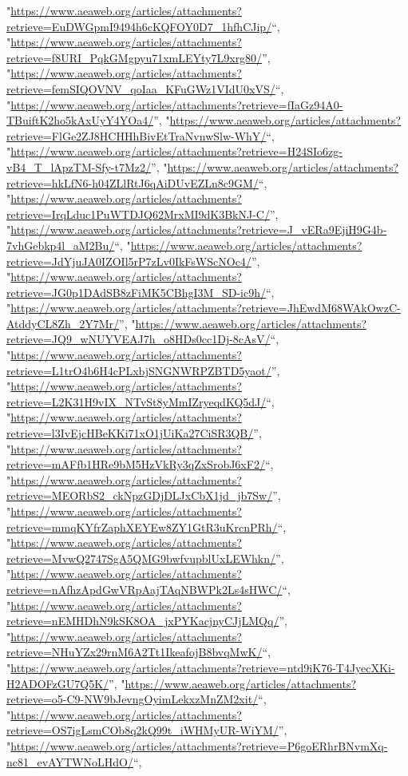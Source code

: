 \documentclass[]{article}
\begin{document}
\begin{itemize}
  "\url{https://www.aeaweb.org/articles/attachments?retrieve=EuDWGpmI9494h6cKQFOY0D7_1hfhCJip/}``,
  "\url{https://www.aeaweb.org/articles/attachments?retrieve=f8URI_PqkGMgpyu71xmLEYty7L9xrg80/}'',
  "\url{https://www.aeaweb.org/articles/attachments?retrieve=femSIQOVNV_qoIaa_KFuGWz1VIdU0xVS/}``,
  "\url{https://www.aeaweb.org/articles/attachments?retrieve=fIaGz94A0-TBuiftK2ho5kAxUyY4YOa4/}'',
  "\url{https://www.aeaweb.org/articles/attachments?retrieve=FlGe2ZJ8HCHHhBivEtTraNvnwSlw-WhY/}``,
  "\url{https://www.aeaweb.org/articles/attachments?retrieve=H24SIo6zg-vB4_T_lApzTM-Sfy-t7Mz2/}'',
  "\url{https://www.aeaweb.org/articles/attachments?retrieve=hkLfN6-h04ZLlRtJ6qAiDUvEZLn8c9GM/}``,
  "\url{https://www.aeaweb.org/articles/attachments?retrieve=IrqLduc1PuWTDJQ62MrxMI9dK3BkNJ-C/}'',
  "\url{https://www.aeaweb.org/articles/attachments?retrieve=J_vERa9EjiH9G4b-7vhGebkp4l_aM2Bu/}``,
  "\url{https://www.aeaweb.org/articles/attachments?retrieve=JdYjuJA0IZOIl5rP7zLv0IkFsWScNOc4/}'',
  "\url{https://www.aeaweb.org/articles/attachments?retrieve=JG0p1DAdSB8zFiMK5CBhgI3M_SD-ic9h/}``,
  "\url{https://www.aeaweb.org/articles/attachments?retrieve=JhEwdM68WAkOwzC-AtddyCL8Zh_2Y7Mr/}'',
  "\url{https://www.aeaweb.org/articles/attachments?retrieve=JQ9_wNUYVEAJ7h_o8HDs0cc1Dj-8cAsV/}``,
  "\url{https://www.aeaweb.org/articles/attachments?retrieve=L1trO4b6H4cPLxbjSNGNWRPZBTD5yaot/}'',
  "\url{https://www.aeaweb.org/articles/attachments?retrieve=L2K31H9vIX_NTvSt8yMmIZryeqdKQ5dJ/}``,
  "\url{https://www.aeaweb.org/articles/attachments?retrieve=l3IvEjcHBeKKi71xO1jUiKa27CiSR3QB/}'',
  "\url{https://www.aeaweb.org/articles/attachments?retrieve=mAFfb1HRe9bM5HzVkRy3qZxSrobJ6xF2/}``,
  "\url{https://www.aeaweb.org/articles/attachments?retrieve=MEORbS2_ckNpzGDjDLJxCbX1jd_jb7Sw/}'',
  "\url{https://www.aeaweb.org/articles/attachments?retrieve=mmqKYfrZaphXEYEw8ZY1GtR3uKrcnPRh/}``,
  "\url{https://www.aeaweb.org/articles/attachments?retrieve=MvwQ2747SgA5QMG9bwfvupblUxLEWhkn/}'',
  "\url{https://www.aeaweb.org/articles/attachments?retrieve=nAfhzApdGwVRpAajTAqNBWPk2Ls4sHWC/}``,
  "\url{https://www.aeaweb.org/articles/attachments?retrieve=nEMHDhN9kSK8OA_jxPYKacjnyCJjLMQq/}'',
  "\url{https://www.aeaweb.org/articles/attachments?retrieve=NHuYZx29rnM6A2Tt1IkeafojB8bvqMwK/}``,
  "\url{https://www.aeaweb.org/articles/attachments?retrieve=ntd9iK76-T4JyecXKi-H2ADOFzGU7Q5K/}'',
  "\url{https://www.aeaweb.org/articles/attachments?retrieve=o5-C9-NW9bJevngOyimLekxzMnZM2xit/}``,
  "\url{https://www.aeaweb.org/articles/attachments?retrieve=OS7igLsmCOb8q2kQ99t_iWHMyUR-WiYM/}'',
  "\url{https://www.aeaweb.org/articles/attachments?retrieve=P6goERhrBNvmXq-nc81_evAYTWNoLHdO/}``,

\end{itemize}
\end{document}
